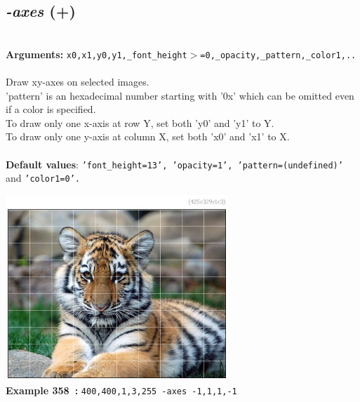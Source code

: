 \documentclass[a4paper,11pt,twoside]{book}
\begin{document}
\subsection{\emph{-axes} (+)}\vspace*{-0.5em}
~\\\textbf{Arguments: } 
{\small \texttt{x0,x1,y0,y1,\_font\_height$>$=0,\_opacity,\_pattern,\_color1,..}}\\~\\
Draw xy-axes on selected images.
~\\'pattern' is an hexadecimal number starting with '0x' which can be omitted
even if a color is specified.
~\\To draw only one x-axis at row Y, set both 'y0' and 'y1' to Y.
~\\To draw only one y-axis at column X, set both 'x0' and 'x1' to X.
~\\~\\\textbf{Default values}: {\small \texttt{'font\_height=13', 'opacity=1', 'pattern=(undefined)'} and \texttt{'color1=0'.}}
\begin{center}\includegraphics[keepaspectratio=true,height=7cm,width=\textwidth]{img/gmic_def358.jpg}\\
{\footnotesize \textbf{Example 358~:} \texttt{400,400,1,3,255 -axes -1,1,1,-1}}
\end{center}
\end{document}
